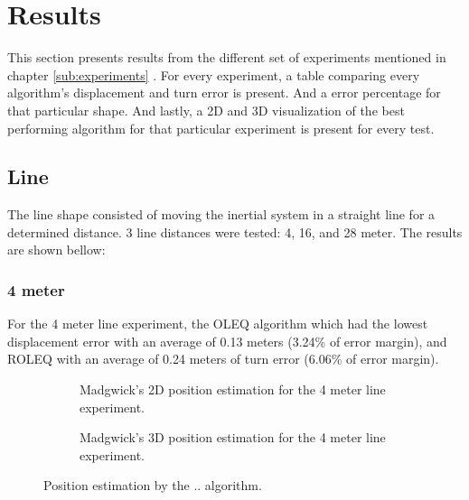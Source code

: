 \section{Results}

This section presents results from the different set of experiments mentioned in chapter \ref{sub:experiments} . For every experiment, a table comparing every algorithm's displacement and turn error is present. And a error percentage for that particular shape. And lastly, a 2D and 3D visualization of the best performing algorithm for that particular experiment is present for every test.

\subsection{Line}

The line shape consisted of moving the inertial system in a straight line for a determined distance. 3 line distances were tested: 4, 16, and 28 meter. The results are shown bellow:

\subsubsection{4 meter}

For the 4 meter line experiment, the OLEQ algorithm which had the lowest displacement error with an average of 0.13 meters (3.24\% of error margin), and ROLEQ with an average of 0.24 meters of turn error (6.06\% of error margin).

\begin{figure}[!h]
    \centering
    
\end{figure}

\begin{figure}[!h]
    \centering
    \begin{subfigure}{0.49\textwidth}
        \centering
        \resizebox{1\linewidth}{!}{}
        \caption{ Madgwick's 2D position estimation for the 4 meter line experiment. }
        \label{fig:line4_2D}
    \end{subfigure}
    \begin{subfigure}{0.49\textwidth}
        \centering
        \resizebox{1\linewidth}{!}{}
        \caption{ Madgwick's 3D position estimation for the 4 meter line experiment. }
        \label{fig:line4_3D}
    \end{subfigure}
    \caption{Position estimation by the .. algorithm.}
    \label{fig:line4}
\end{figure}

